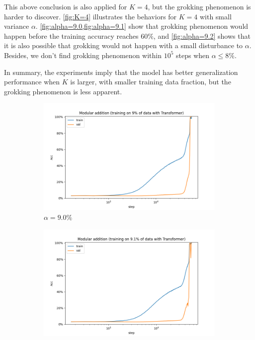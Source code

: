 This above conclusion is also applied for $K=4$, but the grokking phenomenon is harder to discover. \cref{fig:K=4} illustrates the behaviors for $K=4$ with small variance $\alpha$. \cref{fig:alpha=9.0,fig:alpha=9.1} show that
grokking phenomenon would happen before the training accuracy reaches $60\%$, and \cref{fig:alpha=9.2} shows that it is also possible that grokking would not happen with a small disturbance to $\alpha$. Besides, we don't find grokking phenomenon within $10^5$ steps when $\alpha\leq 8\%$.

In summary, the experiments imply that the model has better generalization performance when $K$ is larger, with smaller training data fraction, but the grokking phenomenon is less apparent.

\begin{figure}[!ht]
	\centering
	\begin{subfigure}{0.3\textwidth}
		\centering
		\includegraphics[width=\linewidth]{fig/Transformer_p=31/K=4/dropout=0.1,wd=0.1/alpha=9.0_dropout=0.1_wd=0.1/addition_9.0_Transformer_step.png}
		\caption{$\alpha=9.0\%$}
		\label{fig:alpha=9.0}
	\end{subfigure}
		\begin{subfigure}{0.3\textwidth}
		\centering
		\includegraphics[width=\linewidth]{fig/Transformer_p=31/K=4/dropout=0.1,wd=0.1/alpha=9.1_dropout=0.1_wd=0.1/addition_9.1_Transformer_step.png}

\end{subfigure}
\end{figure}
